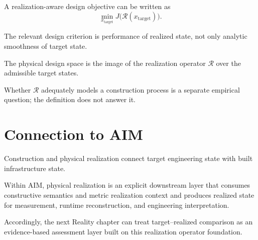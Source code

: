 \begin{definition}
\label{def:realization-aware-objective}
A realization-aware design objective can be written as
\[
\min_{x_{\mathrm{target}}}J\bigl(\mathcal R(x_{\mathrm{target}})\bigr).
\]
\end{definition}

\begin{proposition}
\label{prop:realization-aware-design}
The relevant design criterion is performance of realized state, not only
analytic smoothness of target state.
\end{proposition}

\begin{definition}
\label{prop:physical-design-space}
The physical design space is the image of the realization operator
\(\mathcal R\) over the admissible target states.
\end{definition}

Whether \(\mathcal R\) adequately models a construction process is a
separate empirical question; the definition does not answer it.

\section{Connection to AIM}

\begin{summary}
Construction and physical realization connect target engineering state
with built infrastructure state.

Within AIM, physical realization is an explicit downstream layer that
consumes constructive semantics and metric realization context and
produces realized state for measurement, runtime reconstruction, and
engineering interpretation.

Accordingly, the next Reality chapter can treat target--realized
comparison as an evidence-based assessment layer built on this
realization operator foundation.
\end{summary}
